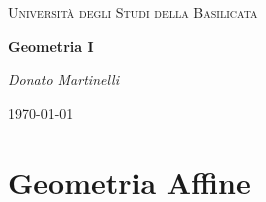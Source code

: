 \documentclass{article}
\theoremstyle{plain}
\theoremstyle{definition}
\theoremstyle{remark}
\begin{document}
\begin{titlepage}
    \centering
	{\textsc{Università degli Studi della Basilicata} \par}
	\vspace{2cm}
    {\huge\bfseries Geometria I\par}
    \vfill
	{\Large\itshape Donato Martinelli\par}
	{\large \today\par}
\end{titlepage}

\tableofcontents

\newpage
\part{Geometria Affine}
\vspace{50pt}
\end{document}

